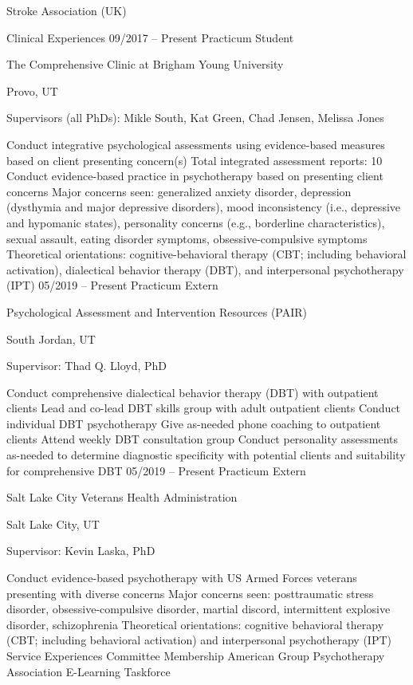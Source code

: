 \documentclass[
]{article}
\begin{document}
Stroke Association (UK)

Clinical Experiences
09/2017 -- Present Practicum Student

The Comprehensive Clinic at Brigham Young University

Provo, UT

Supervisors (all PhDs): Mikle South, Kat Green, Chad Jensen, Melissa Jones

Conduct integrative psychological assessments using evidence-based measures based on client presenting concern(s)
Total integrated assessment reports: 10
Conduct evidence-based practice in psychotherapy based on presenting client concerns
Major concerns seen: generalized anxiety disorder, depression (dysthymia and major depressive disorders), mood inconsistency (i.e., depressive and hypomanic states), personality concerns (e.g., borderline characteristics), sexual assault, eating disorder symptoms, obsessive-compulsive symptoms
Theoretical orientations: cognitive-behavioral therapy (CBT; including behavioral activation), dialectical behavior therapy (DBT), and interpersonal psychotherapy (IPT)
05/2019 -- Present Practicum Extern

Psychological Assessment and Intervention Resources (PAIR)

South Jordan, UT

Supervisor: Thad Q. Lloyd, PhD

Conduct comprehensive dialectical behavior therapy (DBT) with outpatient clients
Lead and co-lead DBT skills group with adult outpatient clients
Conduct individual DBT psychotherapy
Give as-needed phone coaching to outpatient clients
Attend weekly DBT consultation group
Conduct personality assessments as-needed to determine diagnostic specificity with potential clients and suitability for comprehensive DBT
05/2019 -- Present Practicum Extern

Salt Lake City Veterans Health Administration

Salt Lake City, UT

Supervisor: Kevin Laska, PhD

Conduct evidence-based psychotherapy with US Armed Forces veterans presenting with diverse concerns
Major concerns seen: posttraumatic stress disorder, obsessive-compulsive disorder, martial discord, intermittent explosive disorder, schizophrenia
Theoretical orientations: cognitive behavioral therapy (CBT; including behavioral activation) and interpersonal psychotherapy (IPT)
Service Experiences
Committee Membership
American Group Psychotherapy Association E-Learning Taskforce
\end{document}
